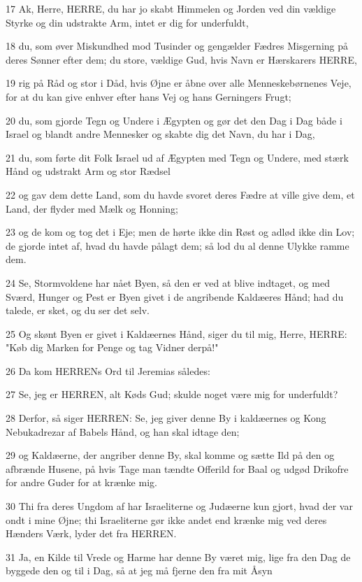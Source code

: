 \par 17 Ak, Herre, HERRE, du har jo skabt Himmelen og Jorden ved din vældige Styrke og din udstrakte Arm, intet er dig for underfuldt,
\par 18 du, som øver Miskundhed mod Tusinder og gengælder Fædres Misgerning på deres Sønner efter dem; du store, vældige Gud, hvis Navn er Hærskarers HERRE,
\par 19 rig på Råd og stor i Dåd, hvis Øjne er åbne over alle Menneskebørnenes Veje, for at du kan give enhver efter hans Vej og hans Gerningers Frugt;
\par 20 du, som gjorde Tegn og Undere i Ægypten og gør det den Dag i Dag både i Israel og blandt andre Mennesker og skabte dig det Navn, du har i Dag,
\par 21 du, som førte dit Folk Israel ud af Ægypten med Tegn og Undere, med stærk Hånd og udstrakt Arm og stor Rædsel
\par 22 og gav dem dette Land, som du havde svoret deres Fædre at ville give dem, et Land, der flyder med Mælk og Honning;
\par 23 og de kom og tog det i Eje; men de hørte ikke din Røst og adlød ikke din Lov; de gjorde intet af, hvad du havde pålagt dem; så lod du al denne Ulykke ramme dem.
\par 24 Se, Stormvoldene har nået Byen, så den er ved at blive indtaget, og med Sværd, Hunger og Pest er Byen givet i de angribende Kaldæeres Hånd; had du talede, er sket, og du ser det selv.
\par 25 Og skønt Byen er givet i Kaldæernes Hånd, siger du til mig, Herre, HERRE: "Køb dig Marken for Penge og tag Vidner derpå!"
\par 26 Da kom HERRENs Ord til Jeremias således:
\par 27 Se, jeg er HERREN, alt Køds Gud; skulde noget være mig for underfuldt?
\par 28 Derfor, så siger HERREN: Se, jeg giver denne By i kaldæernes og Kong Nebukadrezar af Babels Hånd, og han skal idtage den;
\par 29 og Kaldæerne, der angriber denne By, skal komme og sætte Ild på den og afbrænde Husene, på hvis Tage man tændte Offerild for Baal og udgød Drikofre for andre Guder for at krænke mig.
\par 30 Thi fra deres Ungdom af har Israeliterne og Judæerne kun gjort, hvad der var ondt i mine Øjne; thi Israeliterne gør ikke andet end krænke mig ved deres Hænders Værk, lyder det fra HERREN.
\par 31 Ja, en Kilde til Vrede og Harme har denne By været mig, lige fra den Dag de byggede den og til i Dag, så at jeg må fjerne den fra mit Åsyn
